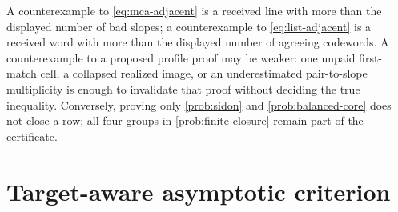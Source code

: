 \documentclass[a4paper,11pt]{amsart}
\theoremstyle{remark}
\begin{document}
A counterexample to \eqref{eq:mca-adjacent} is a received line with more than
the displayed number of bad slopes; a counterexample to
\eqref{eq:list-adjacent} is a received word with more than the displayed
number of agreeing codewords.  A counterexample to a proposed profile
proof may be weaker: one unpaid first-match cell, a collapsed realized image,
or an underestimated pair-to-slope multiplicity is enough to invalidate that
proof without deciding the true inequality.  Conversely, proving only
\cref{prob:sidon} and \cref{prob:balanced-core} does not close a row; all
four groups in \cref{prob:finite-closure} remain part of the certificate.

\section{Target-aware asymptotic criterion}\label{sec:asymptotic}
\end{document}
